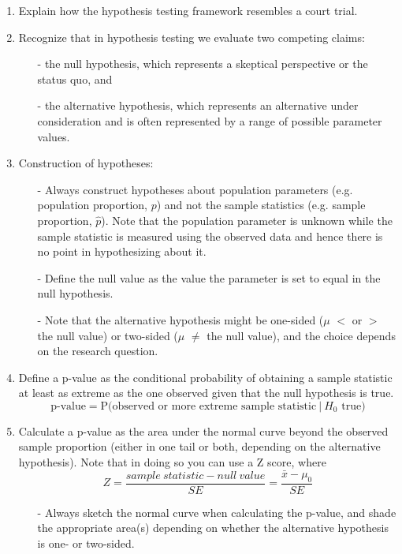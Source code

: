\documentclass[11pt]{article}
\begin{document}
%

\vspace{0.5cm}

%

\begin{enumerate}[resume]
\renewcommand\labelenumi{\textcolor{light}{\textbf{LO \theenumi.}}}

\item Explain how the hypothesis testing framework resembles a court trial.

\item Recognize that in hypothesis testing we evaluate two competing claims: 
\begin{itemize}
\item[-] the null hypothesis, which represents a skeptical perspective or the status quo, and 
\item[-] the alternative hypothesis, which represents an alternative under consideration and is often represented by a range of possible parameter values.
\end{itemize}

\item Construction of hypotheses:
\begin{itemize}
\item[-] Always construct hypotheses about population parameters (e.g. population proportion, $p$) and not the sample statistics (e.g. sample proportion, $\hat{p}$). Note that the population parameter is unknown while the sample statistic is measured using the observed data and hence there is no point in hypothesizing about it.
\item[-] Define the null value as the value the parameter is set to equal in the null hypothesis.
\item[-] Note that the alternative hypothesis might be one-sided ($\mu$ $<$ or $>$ the null value) or two-sided ($\mu$ $\ne$ the null value), and the choice depends on the research question.
\end{itemize}

\item Define a p-value as the conditional probability of obtaining a sample statistic at least as extreme as the one observed given that the null hypothesis is true.
\[ \text{p-value} = \text{P(observed or more extreme sample statistic}~|~H_0 \text{ true)} \]

\item Calculate a p-value as the area under the normal curve beyond the observed sample proportion (either in one tail or both, depending on the alternative hypothesis). Note that in doing so you can use a Z score, where
\[ Z = \frac{sample~statistic - null~value}{SE} = \frac{\bar{x} - \mu_0}{SE} \]
\begin{itemize}
\item[-] Always sketch the normal curve when calculating the p-value, and shade the appropriate area(s) depending on whether the alternative hypothesis is one- or two-sided.
\end{itemize}


\end{enumerate}
\end{document}
